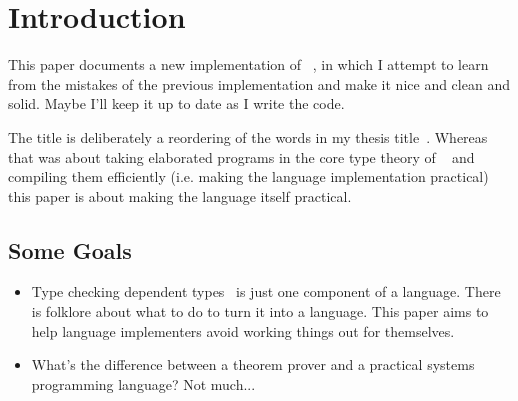 \section{Introduction}

This paper documents a new implementation of \Idris{}~\cite{plpv11}, in which
I attempt to learn from the mistakes of the previous implementation and make
it nice and clean and solid. Maybe I'll keep it up to date as I write the
code.

The title is deliberately a reordering of the words in my thesis
title~\cite{brady-thesis}. Whereas that was about taking elaborated programs
in the core type theory of \Epigram{}~\cite{view-left} and compiling them
efficiently (i.e. making the language implementation practical) this paper is
about making the language itself practical. 

\subsection{Some Goals}

\begin{itemize}
\item Type checking dependent types~\cite{epireloaded,lambdapi} is just one component
 of a language. There is folklore about what to do to turn it into a language. This
 paper aims to help language implementers avoid working things out for themselves.
\item What's the difference between a theorem prover and a practical systems programming
 language? Not much...
\end{itemize}
